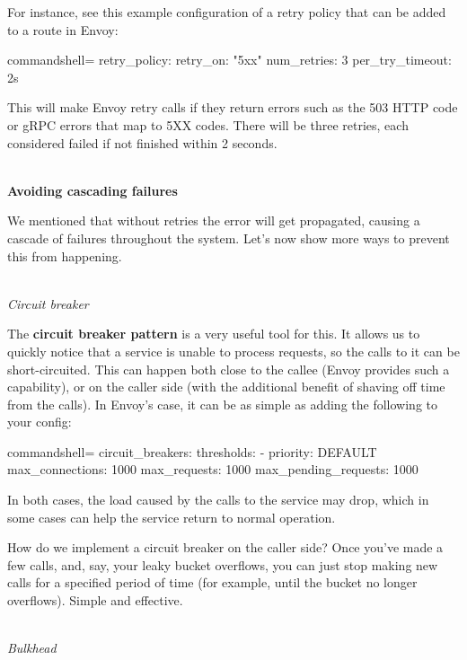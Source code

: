 For instance, see this example configuration of a retry policy that can be added to a route in Envoy:


\begin{tcblisting}{commandshell={}}
retry_policy:
  retry_on: "5xx"
  num_retries: 3
  per_try_timeout: 2s

\end{tcblisting}

This will make Envoy retry calls if they return errors such as the 503 HTTP code or gRPC errors that map to 5XX codes. There will be three retries, each considered failed if not finished within 2 seconds.

\hspace*{\fill} \\ %
\noindent
\textbf{Avoiding cascading failures}

We mentioned that without retries the error will get propagated, causing a cascade of failures throughout the system. Let's now show more ways to prevent this from happening.

\hspace*{\fill} \\ %
\noindent
\textit{Circuit breaker}

The \textbf{circuit breaker pattern} is a very useful tool for this. It allows us to quickly notice that a service is unable to process requests, so the calls to it can be short-circuited. This can happen both close to the callee (Envoy provides such a capability), or on the caller side (with the additional benefit of shaving off time from the calls). In Envoy's case, it can be as simple as adding the following to your config:


\begin{tcblisting}{commandshell={}}
circuit_breakers:
  thresholds:
    - priority: DEFAULT
      max_connections: 1000
      max_requests: 1000
      max_pending_requests: 1000
\end{tcblisting}

In both cases, the load caused by the calls to the service may drop, which in some cases can help the service return to normal operation.

How do we implement a circuit breaker on the caller side? Once you've made a few calls, and, say, your leaky bucket overflows, you can just stop making new calls for a specified period of time (for example, until the bucket no longer overflows). Simple and effective.


\hspace*{\fill} \\ %
\noindent
\textit{Bulkhead}

